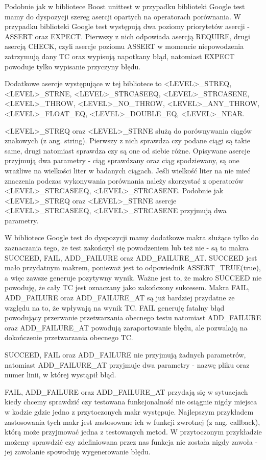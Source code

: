 \documentclass[12pt,a4paper,notitlepage]{report}
\begin{document}
Podobnie jak w bibliotece Boost unittest w przypadku biblioteki Google test mamy do dyspozycji szereg asercji opartych na operatorach porównania. W przypadku biblioteki Google test występują dwa poziomy priorytetów asercji - ASSERT oraz EXPECT. Pierwszy z nich odpowiada asercją REQUIRE, drugi asercją CHECK, czyli asercje poziomu ASSERT w momencie niepowodzenia zatrzymują dany TC oraz wypisują napotkany błąd, natomiast EXPECT powoduje tylko wypisanie przyczyny błędu.

Dodatkowe asercje występujące w tej bibliotece to <LEVEL>{\_}STREQ, <LEVEL>{\_}STRNE, <LEVEL>{\_}STRCASEEQ, <LEVEL>{\_}STRCASENE, <LEVEL>{\_}THROW, <LEVEL>{\_}NO{\_}THROW, <LEVEL>{\_}ANY{\_}THROW, <LEVEL>{\_}FLOAT{\_}EQ, <LEVEL>{\_}DOUBLE{\_}EQ, <LEVEL>{\_}NEAR.

<LEVEL>{\_}STREQ oraz <LEVEL>{\_}STRNE służą do porównywania ciągów znakowych (z ang. string). Pierwszy z nich sprawdza czy podane ciągi są takie same, drugi natomiast sprawdza czy są one od siebie różne. Opisywane asercje przyjmują dwa parametry - ciąg sprawdzany oraz ciąg spodziewany, są one wrażliwe na wielkości liter w badanych ciągach. Jeśli wielkość liter na nie mieć znaczenia podczas wykonywania porównania należy skorzystać z operatorów 
<LEVEL>{\_}STRCASEEQ, <LEVEL>{\_}STRCASENE. Podobnie jak <LEVEL>{\_}STREQ oraz <LEVEL>{\_}STRNE asercje <LEVEL>{\_}STRCASEEQ, <LEVEL>{\_}STRCASENE przyjmują dwa parametry.

W bibliotece Google test do dyspozycji mamy dodatkowe makra służące tylko do zaznaczania tego, że test zakończył się powodzeniem lub też nie - są to makra SUCCEED, FAIL, ADD{\_}FAILURE oraz ADD{\_}FAILURE{\_}AT. SUCCEED jest mało przydatnym makrem, ponieważ jest to odpowiednik ASSERT{\_}TRUE(true), a więc zawsze generuje pozytywny wynik. Ważne jest to, że makro SUCCEED nie powoduję, że cały TC jest oznaczany jako zakończony sukcesem.
Makra FAIL, ADD{\_}FAILURE oraz ADD{\_}FAILURE{\_}AT są już bardziej przydatne ze względu na to, że wpływają na wynik TC. FAIL generuję fatalny błąd powodujący przerwanie przetwarzania obecnego testu natomiast ADD{\_}FAILURE oraz ADD{\_}FAILURE{\_}AT powodują zaraportowanie błędu, ale pozwalają na dokończenie przetwarzania obecnego TC.

SUCCEED, FAIL oraz ADD{\_}FAILURE nie przyjmują żadnych parametrów, natomiast ADD{\_}FAILURE{\_}AT przyjmuje dwa parametry - nazwę pliku oraz numer linii, w której wystąpił błąd.

FAIL, ADD{\_}FAILURE oraz ADD{\_}FAILURE{\_}AT przydają się w sytuacjach kiedy chcemy sprawdzić czy testowana funkcjonalność nie osiągnie nigdy miejsca w kodzie gdzie jedno z przytoczonych makr występuje. Najlepszym przykładem zastosowania tych makr jest zastosowane ich w funkcji zwrotnej (z ang. callback), którą może przyjmować jedna z testowanych metod. W przytoczonym przykładzie możemy sprawdzić czy zdefiniowana przez nas funkcja nie została nigdy zawoła - jej zawołanie spowoduję wygenerowanie błędu.
\end{document}
